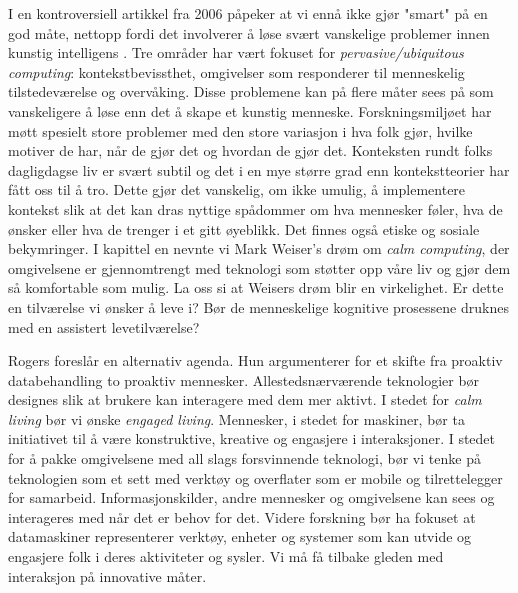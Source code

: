 I en kontroversiell artikkel fra 2006 påpeker \citet{rogers06} at vi ennå ikke gjør "smart" på en god måte, nettopp fordi det involverer å løse svært vanskelige problemer innen kunstig intelligens . Tre områder har vært fokuset for \emph{pervasive/ubiquitous computing}: kontekstbevissthet, omgivelser som responderer til menneskelig tilstedeværelse og overvåking. Disse problemene kan på flere måter sees på som vanskeligere å løse enn det å skape et kunstig menneske. Forskningsmiljøet har møtt spesielt store problemer med den store variasjon i hva folk gjør, hvilke motiver de har, når de gjør det og hvordan de gjør det. Konteksten rundt folks dagligdagse liv er svært subtil og det i en mye større grad enn kontekstteorier har fått oss til å tro. Dette gjør det vanskelig, om ikke umulig, å implementere kontekst slik at det kan dras nyttige spådommer om hva mennesker føler, hva de ønsker eller hva de trenger i et gitt øyeblikk. Det finnes også etiske og sosiale bekymringer. I kapittel en nevnte vi Mark Weiser's drøm om \emph{calm computing}, der omgivelsene er gjennomtrengt med teknologi som støtter opp våre liv og gjør dem så komfortable som mulig. La oss si at Weisers drøm blir en virkelighet. Er dette en tilværelse vi ønsker å leve i? Bør de menneskelige kognitive prosessene druknes med en assistert levetilværelse?

Rogers foreslår en alternativ agenda. Hun argumenterer for et skifte fra proaktiv databehandling to proaktiv mennesker. Allestedsnærværende teknologier bør designes slik at brukere kan interagere med dem mer aktivt. I stedet for \emph{calm living} bør vi ønske \emph{engaged living}. Mennesker, i stedet for maskiner, bør ta initiativet til å være konstruktive, kreative og engasjere i interaksjoner. I stedet for å pakke omgivelsene med all slags forsvinnende teknologi, bør vi tenke på teknologien som et sett med verktøy og overflater som er mobile og tilrettelegger for samarbeid. Informasjonskilder, andre mennesker og omgivelsene kan sees og interageres med når det er behov for det. Videre forskning bør ha fokuset at datamaskiner representerer verktøy, enheter og systemer som kan utvide og engasjere folk i deres aktiviteter og sysler. Vi må få tilbake gleden med interaksjon på innovative måter.

